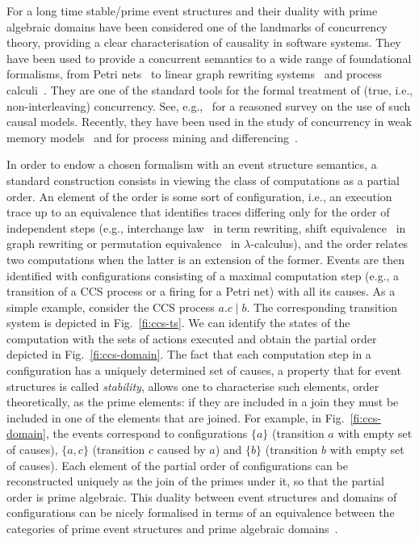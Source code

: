 \documentclass[conference]{IEEEtran}
\begin{document}
For a long time stable/prime event structures and their duality with
prime algebraic domains have been considered one of the landmarks of
concurrency theory, providing a clear characterisation of causality in
software systems. They have been used to provide a concurrent
semantics to a wide range of foundational formalisms, from Petri
nets~\cite{NPW:PNES} to linear graph rewriting
systems~\cite{Handbook,Bal:PhD,Sch:RRSG} and process
calculi~\cite{Win:ESSCCS,VY:TESLP,BMM:ESSNC}. They are one of the
standard tools for the formal treatment of (true, i.e.,
non-interleaving) concurrency. See, e.g.,~\cite{Winskel11} for a
reasoned survey on the use of such causal models. Recently, they have
been used in the study of concurrency in weak memory
models~\cite{PS:CSRA,JR:OTRES,CV:GTARES} and for process mining and
differencing~\cite{DG:PMRES}.

In order to endow a chosen formalism with an event structure
semantics, a standard construction consists in viewing the class of
computations as a partial order. An element of the order is some sort
of configuration, i.e., an execution trace up to an equivalence that
identifies traces differing only for the order of independent steps
(e.g., interchange law~\cite{Mes92} in term rewriting, shift
equivalence~\cite{CMREHL:AAGT} in graph rewriting or permutation
equivalence~\cite{JJL80} in $\lambda$-calculus),
and the order relates two computations when
the latter is an extension of the former.
%
Events are then identified with configurations consisting
of a maximal computation step (e.g., a transition of a CCS process or
a firing for a Petri net) with all its causes.
%
As a simple example, consider the CCS process $a.c \mid b$. 
The corresponding transition system is depicted in Fig.~\ref{fi:ccs-ts}. We can identify the states of the computation with the sets of actions executed and obtain the partial order depicted in Fig.~\ref{fi:ccs-domain}.
%
The fact that each {computation step}  in a configuration has a uniquely determined
set of causes, a property that for event structures is called
\emph{stability}, allows one to characterise such elements, order
theoretically, as the prime elements: if they are included in a join
they must be included in one of the elements that are joined.
%
{For example}, in Fig.~\ref{fi:ccs-domain}, the events correspond to configurations $\{a\}$ (transition $a$ with
empty set of causes), $\{a,c\}$ (transition $c$ caused by $a$) and
$\{b\}$ (transition $b$ with empty set of causes).
%
Each element of the partial order of configurations can be
reconstructed uniquely as the join of the primes under it, so that the partial
order is prime algebraic.
%
This duality between event structures and domains of configurations 
can be nicely formalised in terms of an equivalence between the
categories of prime event structures and prime algebraic 
domains~\cite{NPW:PNES,Win:ES}.
\end{document}
